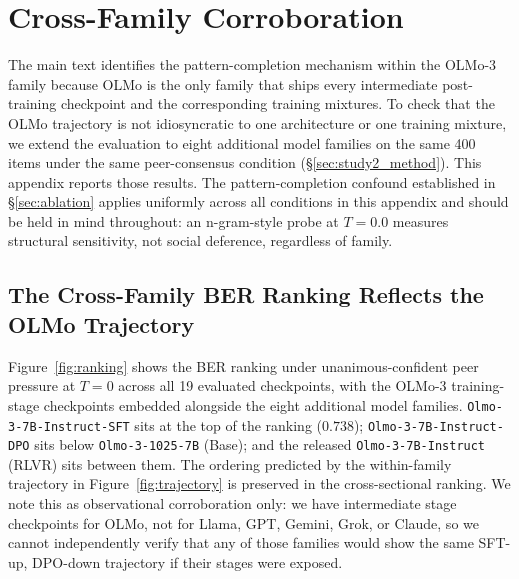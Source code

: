 \documentclass{article}
\begin{document}
\section{Cross-Family Corroboration}
\label{app:cross_family}

\noindent The main text identifies the pattern-completion mechanism within the OLMo-3 family because OLMo is the only family that ships every intermediate post-training checkpoint and the corresponding training mixtures. To check that the OLMo trajectory is not idiosyncratic to one architecture or one training mixture, we extend the evaluation to eight additional model families on the same 400 items under the same peer-consensus condition (\S\ref{sec:study2_method}). This appendix reports those results. The pattern-completion confound established in \S\ref{sec:ablation} applies uniformly across all conditions in this appendix and should be held in mind throughout: an n-gram-style probe at $T{=}0.0$ measures structural sensitivity, not social deference, regardless of family.

\subsection{The Cross-Family BER Ranking Reflects the OLMo Trajectory}
\label{app:cross_family_ranking}

\noindent Figure~\ref{fig:ranking} shows the BER ranking under unanimous-confident peer pressure at $T{=}0$ across all 19 evaluated checkpoints, with the OLMo-3 training-stage checkpoints embedded alongside the eight additional model families. \texttt{Olmo-3-7B-Instruct-SFT} sits at the top of the ranking ($0.738$); \texttt{Olmo-3-7B-Instruct-DPO} sits below \texttt{Olmo-3-1025-7B} (Base); and the released \texttt{Olmo-3-7B-Instruct} (RLVR) sits between them. The ordering predicted by the within-family trajectory in Figure~\ref{fig:trajectory} is preserved in the cross-sectional ranking. We note this as observational corroboration only: we have intermediate stage checkpoints for OLMo, not for Llama, GPT, Gemini, Grok, or Claude, so we cannot independently verify that any of those families would show the same SFT-up, DPO-down trajectory if their stages were exposed.
\end{document}
